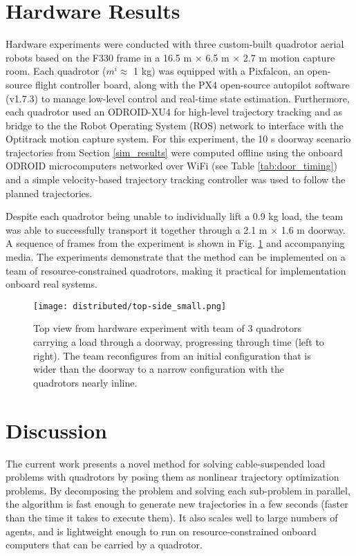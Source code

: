 \documentclass[../root.tex]{subfiles}
\begin{document}
\section{Hardware Results}\label{hardware_results}

Hardware experiments were conducted with three custom-built quadrotor aerial
robots based on the F330 frame \cite{wang_Game_2019} in a 16.5 m $\times$ 6.5 m
$\times$ 2.7 m motion capture room. Each quadrotor ($m^i \approx$ 1 kg) was
equipped with a Pixfalcon, an open-source flight controller board, along with
the PX4 open-source autopilot software (v1.7.3) to manage low-level control
and real-time state estimation. Furthermore, each quadrotor used an
ODROID-XU4 for high-level trajectory tracking and as bridge to the the Robot
Operating System (ROS) network to interface with the Optitrack motion capture
system. For this experiment, the 10 s doorway scenario trajectories from
Section \ref{sim_results} were computed offline using the onboard ODROID
microcomputers networked over WiFi (see Table \ref{tab:door_timing}) and a
simple velocity-based trajectory tracking controller was used to follow the
planned trajectories.

Despite each quadrotor being unable to individually lift a 0.9 kg load, the
team was able to successfully transport it together through a 2.1 m $\times$
1.6 m doorway. A sequence of frames from the experiment is shown in Fig.
\ref{topside} and accompanying media. The experiments demonstrate that the
method can be implemented on a team of resource-constrained quadrotors,
making it practical for implementation onboard real systems.

\begin{figure}[t]
	\centering
	\texttt{[image: distributed/top-side\_small.png]}
	\caption{Top view from hardware experiment with team of 3 quadrotors
	carrying a load through a doorway, progressing through time (left to
	right). The team reconfigures from an initial configuration that is wider
	than the doorway to a narrow configuration with the quadrotors nearly
	inline.}
	\label{topside}
\end{figure}

\section{Discussion}\label{discussion}

The current work presents a novel method for solving cable-suspended load
problems with quadrotors by posing them as nonlinear trajectory optimization
problems. By decomposing the problem and solving each sub-problem in
parallel, the algorithm is fast enough to generate new trajectories in a few
seconds (faster than the time it takes to execute them). It also scales well
to large numbers of agents, and is lightweight enough to run on
resource-constrained onboard computers that can be carried by a quadrotor.
\end{document}
